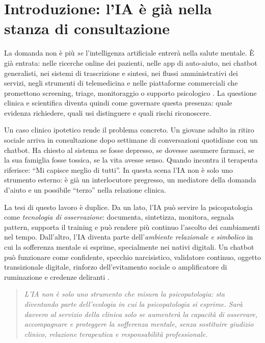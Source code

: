 \documentclass[11pt,a4paper]{article}
\begin{document}
\section{Introduzione: l'IA è già nella stanza di consultazione}
\label{sec:intro}

La domanda non è più \emph{se} l'intelligenza artificiale entrerà nella salute mentale. È già entrata: nelle ricerche online dei pazienti, nelle app di auto-aiuto, nei chatbot generalisti, nei sistemi di trascrizione e sintesi, nei flussi amministrativi dei servizi, negli strumenti di telemedicina e nelle piattaforme commerciali che promettono screening, triage, monitoraggio o supporto psicologico \cite{fda-dhac,who2024}. La questione clinica e scientifica diventa quindi come governare questa presenza: quale evidenza richiedere, quali usi distinguere e quali rischi riconoscere.

Un caso clinico ipotetico rende il problema concreto. Un giovane adulto in ritiro sociale arriva in consultazione dopo settimane di conversazioni quotidiane con un chatbot. Ha chiesto al sistema se fosse depresso, se dovesse assumere farmaci, se la sua famiglia fosse tossica, se la vita avesse senso. Quando incontra il terapeuta riferisce: ``Mi capisce meglio di tutti''. In questa scena l'IA non è solo uno strumento esterno: è già un interlocutore pregresso, un mediatore della domanda d'aiuto e un possibile ``terzo'' nella relazione clinica.

La tesi di questo lavoro è duplice. Da un lato, l'IA può servire la psicopatologia come \emph{tecnologia di osservazione}: documenta, sintetizza, monitora, segnala pattern, supporta il training e può rendere più continuo l'ascolto dei cambiamenti nel tempo. Dall'altro, l'IA diventa parte dell'\emph{ambiente relazionale e simbolico} in cui la sofferenza mentale si esprime, specialmente nei nativi digitali. Un chatbot può funzionare come confidente, specchio narcisistico, validatore continuo, oggetto transizionale digitale, rinforzo dell'evitamento sociale o amplificatore di ruminazione e credenze deliranti \cite{grabb2024,dohnany2025}.

\begin{quote}\itshape
L'IA non è solo uno strumento che misura la psicopatologia: sta diventando parte dell'ecologia in cui la psicopatologia si esprime. Sarà davvero al servizio della clinica solo se aumenterà la capacità di osservare, accompagnare e proteggere la sofferenza mentale, senza sostituire giudizio clinico, relazione terapeutica e responsabilità professionale.
\end{quote}
\end{document}
